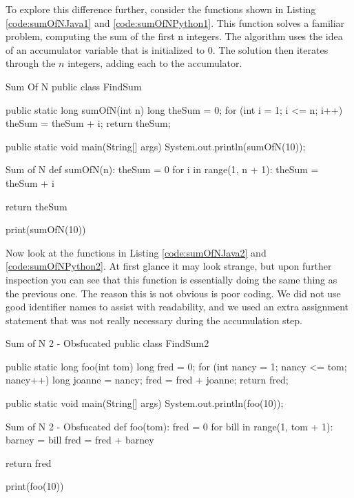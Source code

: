 To explore this difference further, consider the functions shown in Listing \ref{code:sumOfNJava1} and \ref{code:sumOfNPython1}. This function solves a familiar problem, computing the sum of the first n integers. The algorithm uses the idea of an accumulator variable that is initialized to 0. The solution then iterates through the $n$ integers, adding each to the accumulator.

\begin{javacode}[label={code:sumOfNJava1}]{Sum Of N}
public class FindSum {
	public static long sumOfN(int n) {
		long theSum = 0;
		for (int i = 1; i <= n; i++) {
			theSum = theSum + i;
		}
		return theSum;
	}
	
	public static void main(String[] args) {
		System.out.println(sumOfN(10));
	}
}
\end{javacode}


\begin{pycode}[label={code:sumOfNPython1}]{Sum of N}	
def sumOfN(n):
	theSum = 0
	for i in range(1, n + 1):
		theSum = theSum + i

return theSum

print(sumOfN(10))
\end{pycode}

Now look at the functions in Listing \ref{code:sumOfNJava2} and \ref{code:sumOfNPython2}. At first glance it may look strange, but upon further inspection you can see that this function is essentially doing the same thing as the previous one. The reason this is not obvious is poor coding. We did not use good identifier names to assist with readability, and we used an extra assignment statement that was not really necessary during the accumulation step.

\begin{javacode}[label={code:sumOfNJava2}]{Sum of N 2 - Obsfucated}
public class FindSum2 {
	public static long foo(int tom) {
		long fred = 0;
		for (int nancy = 1; nancy <= tom; nancy++) {
			long joanne = nancy;
			fred = fred + joanne;
		}
		return fred;
	}
	
	public static void main(String[] args) {
		System.out.println(foo(10));
	}
}
\end{javacode}

\begin{pycode}[label={code:sumOfNPython2}]{Sum of N 2 - Obsfucated}
def foo(tom):
	fred = 0
	for bill in range(1, tom + 1):
		barney = bill
		fred = fred + barney
	
	return fred

print(foo(10))
\end{pycode}

